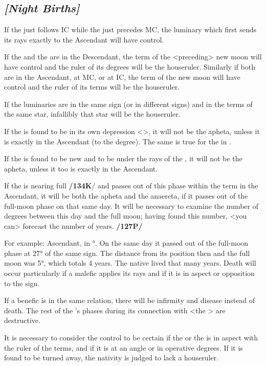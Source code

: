 \subsection{\textit{[Night Births]}}

If the \Sun\xspace just follows IC while the \Moon\xspace just
precedes MC, the luminary which first sends its rays exactly to the Ascendant will have control. 

If the \Sun\xspace and the \Moon\xspace are in the Descendant, the term of the <preceding> new moon will have control and the ruler of its degrees will be the houseruler. Similarly if both are in the Ascendant, at MC, or at IC, the term of the new moon will have control and the ruler of its terms will be the houseruler. 

If the luminaries are in the same sign (or in different signs) and in the terms of the same star, infallibly that star will be the houseruler.

If the \Sun\xspace is found to be in its own depression <\Libra>, it will not be the apheta, unless it is exactly in
the Ascendant (to the degree). The same is true for the \Moon\xspace in \Scorpio\xspace <its depression>. 

If the \Moon\xspace is found to be new and to be under the rays of the \Sun, it will not be the apheta, unless it too is exactly in the Ascendant.

If the \Moon\xspace is nearing full \textbf{/134K}/ and passes out of this phase within the term in the Ascendant, it will be both the apheta and the anaereta, if it passes out of the full-moon phase on that same day. It will be necessary to examine the number of degrees between this day and the full moon; having found this number, <you can> forecast the number of years. \textbf{/127P/}

For example: Ascendant, \Moon\xspace in °. On the same
day it passed out of the full-moon phase at 27° of the same sign. The distance from its position then and the full moon was 5°, which totals 4 years. The native lived that many years. Death will occur particularly if a malefic applies its rays and if it is in aspect or opposition to the sign.

If a benefic is in the same relation, there will be infirmity and disease instead of death. The rest of the \Moon’s phases during its connection with <the \Sun> are destructive.

It is necessary to consider the control to be certain if the \Sun\xspace or the \Moon\xspace is in aspect with the ruler of the terms, and if it is at an angle or in operative degrees. If it is found to be turned away, the nativity is judged to lack a houseruler. 

